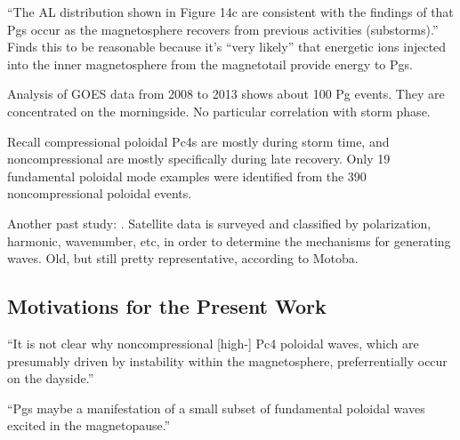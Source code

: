 ``The AL distribution shown in Figure 14c are consistent with the findings of \cite{rostoker_1979} that Pgs occur as the magnetosphere recovers from previous activities (substorms).''\cite{motoba_2015} Finds this to be reasonable because it's ``very likely'' that energetic ions injected into the inner magnetosphere from the magnetotail provide energy to Pgs. 

Analysis of GOES data from 2008 to 2013 shows about 100 Pg events. They are concentrated on the morningside. No particular correlation with storm phase\cite{motoba_2015}. 

Recall compressional poloidal Pc4s are mostly during storm time, and noncompressional are mostly specifically during late recovery\cite{dai_2015}. Only 19 fundamental poloidal mode examples were identified from the 390 noncompressional poloidal events. 

Another past study: \cite{takahashi_1984}. Satellite data is surveyed and classified by polarization, harmonic, wavenumber, etc, in order to determine the mechanisms for generating \Alfven waves. Old, but still pretty representative, according to Motoba\cite{motoba_2015}. 

\subsection{Motivations for the Present Work}




``It is not clear why noncompressional [high-\azm] Pc4 poloidal waves, which are presumably driven by instability within the magnetosphere, preferrentially occur on the dayside.\cite{dai_2015}''

``Pgs maybe a manifestation of a small subset of fundamental poloidal waves excited in the magnetopause.'' \cite{takahashi_2013}


